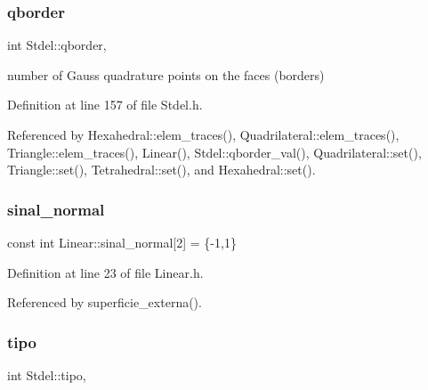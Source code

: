 \mbox{\label{classStdel_a63a106b928d211c71d5fec6449ef4d51}} 
\subsubsection{\texorpdfstring{qborder}{qborder}}
{\footnotesize\ttfamily int Stdel\+::qborder\hspace{0.3cm}{\ttfamily [protected]}, {\ttfamily [inherited]}}



number of Gauss quadrature points on the faces (borders) 



Definition at line 157 of file Stdel.\+h.



Referenced by Hexahedral\+::elem\+\_\+traces(), Quadrilateral\+::elem\+\_\+traces(), Triangle\+::elem\+\_\+traces(), Linear(), Stdel\+::qborder\+\_\+val(), Quadrilateral\+::set(), Triangle\+::set(), Tetrahedral\+::set(), and Hexahedral\+::set().

\mbox{\label{classLinear_a4bfb0666908c95ae7abcad0501e39ca9}} 
\subsubsection{\texorpdfstring{sinal\+\_\+normal}{sinal\_normal}}
{\footnotesize\ttfamily const int Linear\+::sinal\+\_\+normal\mbox{[}2\mbox{]} = \{-\/1,1\}\hspace{0.3cm}{\ttfamily [private]}}



Definition at line 23 of file Linear.\+h.



Referenced by superficie\+\_\+externa().

\mbox{\label{classStdel_a68f8781a42728758ccde39e15cd319ed}} 
\subsubsection{\texorpdfstring{tipo}{tipo}}
{\footnotesize\ttfamily int Stdel\+::tipo\hspace{0.3cm}{\ttfamily [protected]}, {\ttfamily [inherited]}}



